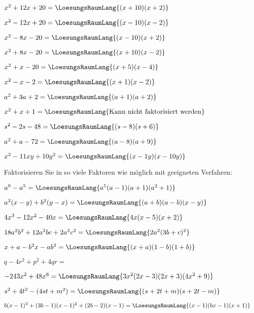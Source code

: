 \begin{bbwAufgabenBlock}
\item $x^2 + 12x + 20 = \LoesungsRaumLang{(x+10)(x+2)}$
\item $x^2 - 12x + 20 = \LoesungsRaumLang{(x-10)(x-2)}$
\item $x^2 - 8x - 20 = \LoesungsRaumLang{(x-10)(x+2)}$
\item $x^2 + 8x - 20 = \LoesungsRaumLang{(x+10)(x-2)}$
\item $x^2 + x - 20 = \LoesungsRaumLang{(x+5)(x-4)}$
\item $x^2 - x - 2 = \LoesungsRaumLang{(x+1)(x-2)}$
\item $a^2+3a+2 = \LoesungsRaumLang{(a+1)(a+2)}$
\item $x^2 + x + 1 = \LoesungsRaumLang{\textrm{Kann nicht faktorisiert werden}}$
\item $s^2 -2s - 48 = \LoesungsRaumLang{(s-8)(s+6)}$
\item $a^2 + a - 72 = \LoesungsRaumLang{(a-8)(a+9)}$
\item $x^2 - 11xy + 10y^2 = \LoesungsRaumLang{(x-1y)(x-10y)}$
\end{bbwAufgabenBlock}

\platzFuerBerechnungenBisEndeSeite{}



Faktorisieren Sie in so viele Faktoren wie möglich
mit geeigneten Verfahren:


\begin{bbwAufgabenBlock}
\item $a^9-a^5 = \LoesungsRaumLang{a^5(a-1)(a+1)(a^2+1)}$
\item $a^2(x-y) + b^2(y-x) =\LoesungsRaumLang{(a+b)(a-b)(x-y)}$
\item $4x^3-12x^2-40x = \LoesungsRaumLang{4x(x-5)(x+2)}$
\item $18a^2b^2+12a^2bc + 2a^2c^2 = \LoesungsRaumLang{2a^2(3b+c)^2}$
\item $x+a-b^2x-ab^2 = \LoesungsRaumLang{(x+a)(1-b)(1+b)}$
\item $q-4r^2+p^2 + 4qr = $
\item $-243x^2 + 48x^6 = \LoesungsRaumLang{3x^2(2x-3)(2x+3)(4x^2+9)}$
\item $s^2+4t^2-(4st+m^2) = \LoesungsRaumLang{(s+2t+m)(s+2t-m)}$
\item $b(x-1)^3 + (3b-1)(x-1)^2 + (2b-2)(x-1) = \LoesungsRaumLang{(x-1)(bx-1)(x+1)}$
\end{bbwAufgabenBlock}

\platzFuerBerechnungenBisEndeSeite{}





